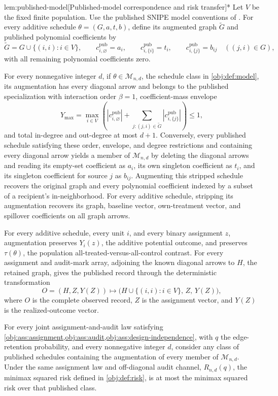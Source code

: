 \begin{propositionv}{lem:published-model}[Published-model correspondence and risk transfer]*
Let \(V\) be the fixed finite population. Use the published SNIPE model conventions of \citep[Sections 3.1--3.2, Assumptions 1--2, equations (3.2)--(3.3)]{CortezRodriguezEichhornYu2023SNIPE}. For every additive schedule \(\theta=(G,a,t,b)\), define its augmented graph \(\widetilde G\) and published polynomial coefficients by
\[
\widetilde G=G\cup\{(i,i):i\in V\},\qquad
c^{\mathrm{pub}}_{i,\varnothing}=a_i,\qquad
c^{\mathrm{pub}}_{i,\{i\}}=t_i,\qquad
c^{\mathrm{pub}}_{i,\{j\}}=b_{ij}\quad ((j,i)\in G),
\]
with all remaining polynomial coefficients zero.

For every nonnegative integer \(d\), if \(\theta\in\mathcal M_{n,d}\), the schedule class in \cref{obj:def:model}, its augmentation has every diagonal arrow and belongs to the published specialization with interaction order \(\beta=1\), coefficient-mass envelope
\[
Y_{\max}
=\max_{i\in V}
\left(
|c^{\mathrm{pub}}_{i,\varnothing}|
+\sum_{j:(j,i)\in\widetilde G}
|c^{\mathrm{pub}}_{i,\{j\}}|
\right)
\le 1,
\]
and total in-degree and out-degree at most \(d+1\). Conversely, every published schedule satisfying these order, envelope, and degree restrictions and containing every diagonal arrow yields a member of \(\mathcal M_{n,d}\) by deleting the diagonal arrows and reading its empty-set coefficient as \(a_i\), its own singleton coefficient as \(t_i\), and its singleton coefficient for source \(j\) as \(b_{ij}\). Augmenting this stripped schedule recovers the original graph and every polynomial coefficient indexed by a subset of a recipient's in-neighborhood. For every additive schedule, stripping its augmentation recovers its graph, baseline vector, own-treatment vector, and spillover coefficients on all graph arrows.

For every additive schedule, every unit \(i\), and every binary assignment \(z\), augmentation preserves \(Y_i(z)\), the additive potential outcome, and preserves \(\tau(\theta)\), the population all-treated-versus-all-control contrast. For every assignment and audit-mark array, adjoining the known diagonal arrows to \(H\), the retained graph, gives the published record through the deterministic transformation
\[
O=(H,Z,Y(Z))
\longmapsto
\bigl(H\cup\{(i,i):i\in V\},\,Z,\,Y(Z)\bigr),
\]
where \(O\) is the complete observed record, \(Z\) is the assignment vector, and \(Y(Z)\) is the realized-outcome vector.

For every joint assignment-and-audit law satisfying \cref{obj:ass:assignment,obj:ass:audit,obj:ass:design-independence}, with \(q\) the edge-retention probability, and every nonnegative integer \(d\), consider any class of published schedules containing the augmentation of every member of \(\mathcal M_{n,d}\). Under the same assignment law and off-diagonal audit channel, \(R_{n,d}(q)\), the minimax squared risk defined in \cref{obj:def:risk}, is at most the minimax squared risk over that published class.
\end{propositionv}
